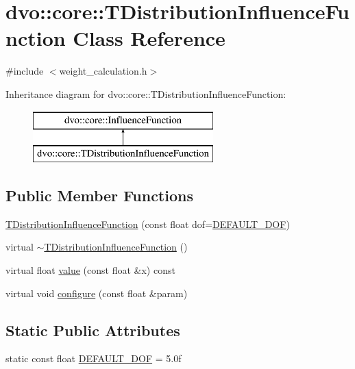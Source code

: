 \hypertarget{classdvo_1_1core_1_1_t_distribution_influence_function}{}\section{dvo\+:\+:core\+:\+:T\+Distribution\+Influence\+Function Class Reference}
\label{classdvo_1_1core_1_1_t_distribution_influence_function}


{\ttfamily \#include $<$weight\+\_\+calculation.\+h$>$}

Inheritance diagram for dvo\+:\+:core\+:\+:T\+Distribution\+Influence\+Function\+:\begin{figure}[H]
\begin{center}
\leavevmode
\includegraphics[height=2.000000cm]{classdvo_1_1core_1_1_t_distribution_influence_function}
\end{center}
\end{figure}
\subsection*{Public Member Functions}
\begin{DoxyCompactItemize}
\item 
\mbox{\hyperlink{classdvo_1_1core_1_1_t_distribution_influence_function_ae58bd8035bc312c717b041d9dce81d48}{T\+Distribution\+Influence\+Function}} (const float dof=\mbox{\hyperlink{classdvo_1_1core_1_1_t_distribution_influence_function_a7a64badce04fe13458febb2371d216dd}{D\+E\+F\+A\+U\+L\+T\+\_\+\+D\+OF}})
\item 
virtual \mbox{\hyperlink{classdvo_1_1core_1_1_t_distribution_influence_function_a60d61b5e830b73bb6ab223abb2705def}{$\sim$\+T\+Distribution\+Influence\+Function}} ()
\item 
virtual float \mbox{\hyperlink{classdvo_1_1core_1_1_t_distribution_influence_function_a3210e7ab6f57975751e75845d3d22598}{value}} (const float \&x) const
\item 
virtual void \mbox{\hyperlink{classdvo_1_1core_1_1_t_distribution_influence_function_ad9030e81f013c14015c3ad97a2f821be}{configure}} (const float \&param)
\end{DoxyCompactItemize}
\subsection*{Static Public Attributes}
\begin{DoxyCompactItemize}
\item 
static const float \mbox{\hyperlink{classdvo_1_1core_1_1_t_distribution_influence_function_a7a64badce04fe13458febb2371d216dd}{D\+E\+F\+A\+U\+L\+T\+\_\+\+D\+OF}} = 5.\+0f
\end{DoxyCompactItemize}


